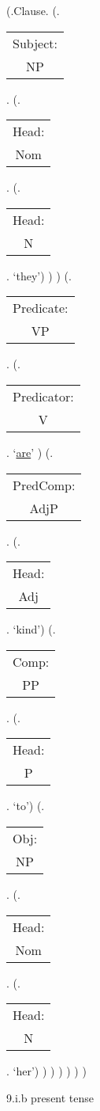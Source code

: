 \documentclass[12pt,letterpaper]{article}
\begin{document}
\begin{figure}
	\begin{center}
		\begin{parsetree}
			(.Clause.
			(.\begin{tabular}{c}Subject:\\NP\end{tabular}.  
			(.\begin{tabular}{c}Head:\\Nom\end{tabular}.
			(.\begin{tabular}{c}Head:\\N\end{tabular}. `they')
			)
			)
			(.\begin{tabular}{c}Predicate:\\VP\end{tabular}.
			(.\begin{tabular}{c}Predicator:\\V\end{tabular}. `\underline{are}' )
			(.\begin{tabular}{c}PredComp:\\AdjP\end{tabular}.
			(.\begin{tabular}{c}Head:\\Adj\end{tabular}. `kind')
			(.\begin{tabular}{c}Comp:\\PP\end{tabular}.
			(.\begin{tabular}{c}Head:\\P\end{tabular}. `to')
			(.\begin{tabular}{c}Obj:\\NP\end{tabular}. 
			(.\begin{tabular}{c}Head:\\Nom\end{tabular}. 
			(.\begin{tabular}{c}Head:\\N\end{tabular}. `her')
			)
			)
			)
			)
			)
			)
			
			
		\end{parsetree}
		\hfill \break \hfill \break
		9.i.b present tense
	\end{center}
\end{figure}
\end{document}
